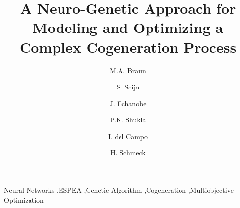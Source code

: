 \documentclass[preprint,12pt,authoryear]{elsarticle}
\begin{document}
\begin{frontmatter}



\title{A Neuro-Genetic Approach for Modeling and Optimizing a Complex Cogeneration Process}


\author[kit]{M.A. Braun}
\author[upv]{S. Seijo}
\author[upv]{J. Echanobe}
\author[kit]{P.K. Shukla}
\author[upv]{I. del Campo}
\author[kit]{H. Schmeck}

\address[upv]{Department of Electricity and Electronics, UPV/EHU, Spain}
\address[kit]{Institute AIFB, KIT, Karlsruhe, Germany}

\begin{abstract}

\end{abstract}

\begin{keyword}
Neural Networks \sep ESPEA \sep Genetic Algorithm \sep Cogeneration \sep Multiobjective Optimization


\end{keyword}

\end{frontmatter}







\end{document}
